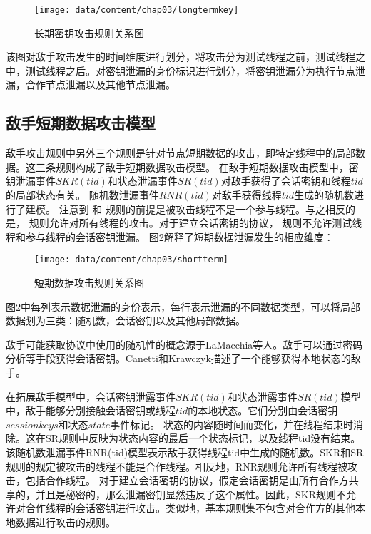 \begin{figure}[htp]
	\centering
	\texttt{[image: data/content/chap03/longtermkey]}
	\caption{长期密钥攻击规则关系图}
	\label{fig-longtermkey}
\end{figure}

该图对敌手攻击发生的时间维度进行划分，将攻击分为测试线程之前，测试线程之中，测试线程之后。对密钥泄漏的身份标识进行划分，将密钥泄漏分为执行节点泄漏，合作节点泄漏以及其他节点泄漏。
\subsection{敌手短期数据攻击模型}
敌手攻击规则中另外三个规则是针对节点短期数据的攻击，即特定线程中的局部数据。这三条规则构成了敌手短期数据攻击模型。
在敌手短期数据攻击模型中，密钥泄漏事件$SKR(tid)$和状态泄漏事件$SR(tid)$对敌手获得了会话密钥和线程$tid$的局部状态有关。
随机数泄漏事件$RNR(tid)$对敌手获得线程$tid$生成的随机数进行了建模。
注意到  和  规则的前提是被攻击线程不是一个参与线程。与之相反的是，  规则允许对所有线程的攻击。对于建立会话密钥的协议，  规则不允许测试线程和参与线程的会话密钥泄漏。
	图\ref{fig-shorttermkey}解释了短期数据泄漏发生的相应维度：
 \begin{figure}[htp]
	\centering
	\texttt{[image: data/content/chap03/shortterm]}
	\caption{短期数据攻击规则关系图}
	\label{fig-shorttermkey}
\end{figure}

图\ref{fig-shorttermkey}中每列表示数据泄漏的身份表示，每行表示泄漏的不同数据类型，可以将局部数据划为三类：随机数，会话密钥以及其他局部数据。

敌手可能获取协议中使用的随机性的概念源于LaMacchia等人\cite{LaMacchia2007}。敌手可以通过密码分析等手段获得会话密钥\cite{Bellare1994}。Canetti和Krawczyk\cite{Canetti2001}描述了一个能够获得本地状态的敌手。

在拓展敌手模型中，会话密钥泄露事件$SKR(tid)$和状态泄露事件$SR(tid)$模型中，敌手能够分别接触会话密钥或线程$tid$的本地状态。它们分别由会话密钥$sessionkeys$和状态$state$事件标记。
状态的内容随时间而变化，并在线程结束时消除。这在SR规则中反映为状态内容的最后一个状态标记，以及线程tid没有结束。该随机数泄漏事件RNR(tid)模型表示敌手获得线程tid中生成的随机数。SKR和SR规则的规定被攻击的线程不能是合作线程。相反地，RNR规则允许所有线程被攻击，包括合作线程。
对于建立会话密钥的协议，假定会话密钥是由所有合作方共享的，并且是秘密的，那么泄漏密钥显然违反了这个属性。因此，SKR规则不允许对合作线程的会话密钥进行攻击。类似地，基本规则集不包含对合作方的其他本地数据进行攻击的规则。


